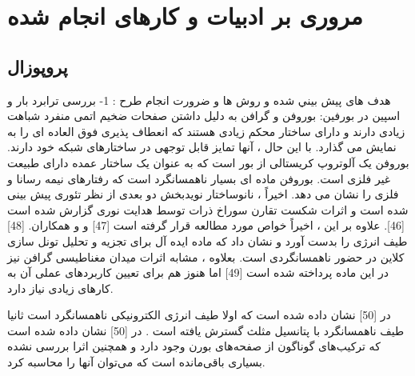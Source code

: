 \chapter{مروری بر ادبیات و کار‌های انجام شده}
\clearpage
\section{پروپوزال}
هدف های پيش بيني شده و روش ها و ضرورت انجام طرح :
1-	بررسی ترابرد بار و اسپین در بورفین:
بوروفن و گرافن به دلیل داشتن صفحات ضخیم اتمی منفرد شباهت زیادی دارند و دارای ساختار محکم زیادی هستند که انعطاف پذیری فوق العاده ای را به نمایش می گذارد. با این حال ، آنها تمایز قابل توجهی در ساختارهای شبکه خود دارند. بوروفن یک آلوتروپ کریستالی از بور است که به عنوان یک ساختار عمده دارای طبیعت غیر فلزی است. بوروفن ماده ای بسیار ناهمسانگرد است که رفتارهای نیمه رسانا و فلزی را نشان می دهد. اخیراً ، نانوساختار نویدبخش دو بعدی از نظر تئوری پیش بینی شده است و اثرات شکست تقارن سوراخ ذرات توسط هدایت نوری گزارش شده است [46]. علاوه بر این ، اخیراً خواص  مورد مطالعه قرار گرفته است [47] و  و همکاران. [48] طیف انرژی را بدست آورد و نشان داد که ماده ایده آل برای تجزیه و تحلیل تونل سازی کلاین در حضور ناهمسانگردی است. بعلاوه ، مشابه اثرات میدان مغناطیسی گرافن نیز در این ماده پرداخته شده است [49] اما هنوز هم برای تعیین کاربردهای عملی آن به کارهای زیادی نیاز دارد.

در [50] نشان داده شده است که اولا طیف انرژی الکترونیکی ناهمسانگرد است ثانیا طیف ناهمسانگرد با پتانسیل مثلث گسترش یافته است .
در [50] نشان داده شده‌ است که  ترکیب‌های گوناگون از صفحه‌های بورن وجود دارد و همچنین اثرا بررسی نشده بسیاری باقی‌مانده است که می‌توان آنها را محاسبه کرد.

